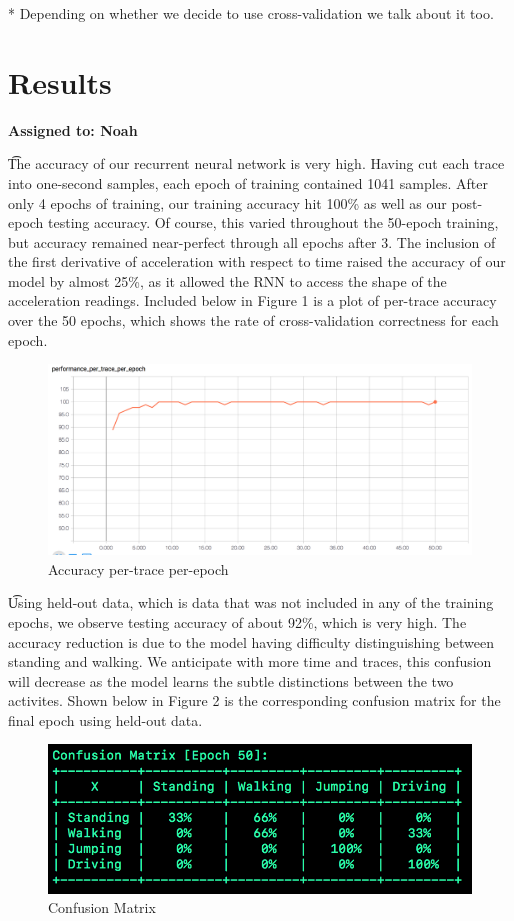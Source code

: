 \documentclass{article}
\begin{document}
* Depending on whether we decide to use cross-validation we talk about it too.


\section{Results}
\vspace{-.3cm}
\textbf{Assigned to: Noah}

\t The accuracy of our recurrent neural network is very high. Having cut each trace into one-second samples, each epoch of training contained 1041 samples. After only 4 epochs of training, our training accuracy hit 100\% as well as our post-epoch testing accuracy. Of course, this varied throughout the 50-epoch training, but accuracy remained near-perfect through all epochs after 3. The inclusion of the first derivative of acceleration with respect to time raised the accuracy of our model by almost 25\%, as it allowed the RNN to access the shape of the acceleration readings. Included below in Figure 1 is a plot of per-trace accuracy over the 50 epochs, which shows the rate of cross-validation correctness for each epoch.

\begin{figure}[h]
    \centering
    \includegraphics[width=0.7\linewidth]{figures/acc_ptpe.png}
    \caption{Accuracy per-trace per-epoch \label{fig:acc_ptpe}}
\end{figure}

\t Using held-out data, which is data that was not included in any of the training epochs, we observe testing accuracy of about 92\%, which is very high. The accuracy reduction is due to the model having difficulty distinguishing between standing and walking. We anticipate with more time and traces, this confusion will decrease as the model learns the subtle distinctions between the two activites. Shown below in Figure 2 is the corresponding confusion matrix for the final epoch using held-out data.

\begin{figure}[h]
    \centering
    \includegraphics[width=0.8\linewidth]{figures/confusion.png}
    \caption{Confusion Matrix \label{fig:confusion}}
\end{figure}
\end{document}
